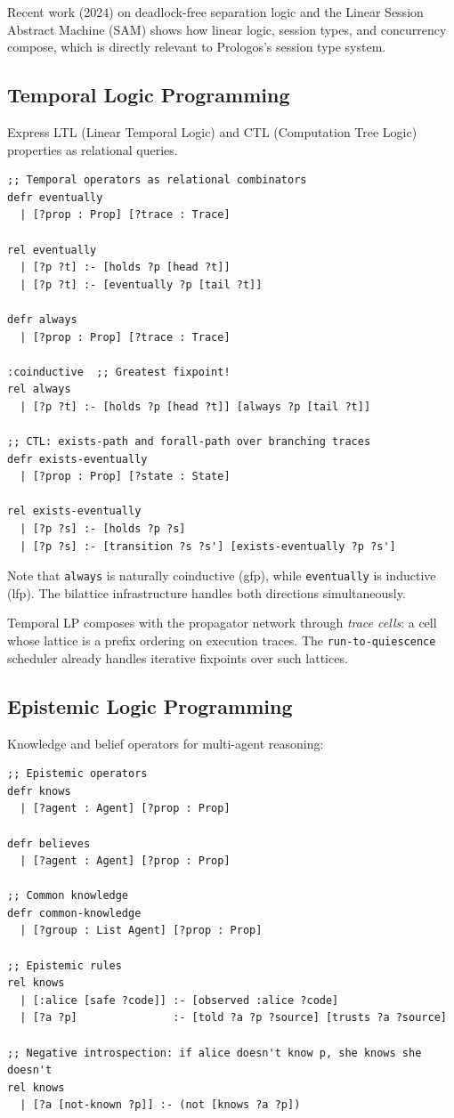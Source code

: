 \documentclass[11pt]{article}
\begin{document}
Recent work (2024) on deadlock-free separation logic and the Linear Session
Abstract Machine (SAM) shows how linear logic, session types, and concurrency
compose, which is directly relevant to Prologos's session type system.
\subsection{Temporal Logic Programming}
\label{sec:org9853e94}

Express LTL (Linear Temporal Logic) and CTL (Computation Tree Logic)
properties as relational queries.

\begin{verbatim}
;; Temporal operators as relational combinators
defr eventually
  | [?prop : Prop] [?trace : Trace]

rel eventually
  | [?p ?t] :- [holds ?p [head ?t]]
  | [?p ?t] :- [eventually ?p [tail ?t]]

defr always
  | [?prop : Prop] [?trace : Trace]

:coinductive  ;; Greatest fixpoint!
rel always
  | [?p ?t] :- [holds ?p [head ?t]] [always ?p [tail ?t]]

;; CTL: exists-path and forall-path over branching traces
defr exists-eventually
  | [?prop : Prop] [?state : State]

rel exists-eventually
  | [?p ?s] :- [holds ?p ?s]
  | [?p ?s] :- [transition ?s ?s'] [exists-eventually ?p ?s']
\end{verbatim}

Note that \texttt{always} is naturally coinductive (gfp), while \texttt{eventually} is
inductive (lfp). The bilattice infrastructure handles both directions
simultaneously.

Temporal LP composes with the propagator network through \emph{trace cells}:
a cell whose lattice is a prefix ordering on execution traces. The
\texttt{run-to-quiescence} scheduler already handles iterative fixpoints over
such lattices.
\subsection{Epistemic Logic Programming}
\label{sec:orgf0e7172}

Knowledge and belief operators for multi-agent reasoning:

\begin{verbatim}
;; Epistemic operators
defr knows
  | [?agent : Agent] [?prop : Prop]

defr believes
  | [?agent : Agent] [?prop : Prop]

;; Common knowledge
defr common-knowledge
  | [?group : List Agent] [?prop : Prop]

;; Epistemic rules
rel knows
  | [:alice [safe ?code]] :- [observed :alice ?code]
  | [?a ?p]               :- [told ?a ?p ?source] [trusts ?a ?source]

;; Negative introspection: if alice doesn't know p, she knows she doesn't
rel knows
  | [?a [not-known ?p]] :- (not [knows ?a ?p])
\end{verbatim}
\end{document}
